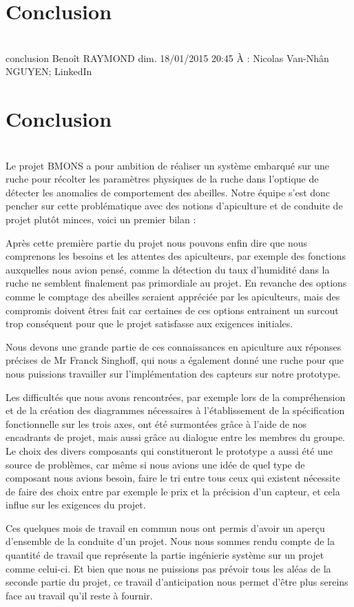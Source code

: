 \chapter{Conclusion}\\

conclusion
Benoît RAYMOND
dim. 18/01/2015 20:45
À :
Nicolas Van-Nhân NGUYEN;
LinkedIn

\chapter{Conclusion}\\


Le projet BMONS a pour ambition de réaliser un système embarqué sur une ruche pour récolter les paramètres physiques de la ruche dans l’optique de détecter les anomalies de comportement des abeilles. Notre équipe s’est donc pencher sur cette problématique avec des notions d’apiculture et de conduite de projet plutôt minces, voici un premier bilan :

Après cette première partie du projet nous pouvons enfin dire que nous comprenons les besoins et les attentes des apiculteurs, par exemple des fonctions auxquelles nous avion pensé, comme la détection du taux d'humidité dans la ruche ne semblent finalement pas primordiale au projet. En revanche des options comme le comptage des abeilles seraient appréciée par les apiculteurs, mais des compromis doivent êtres fait car certaines de ces options entrainent un surcout trop conséquent pour que le projet satisfasse aux exigences initiales.\newline 

Nous devons une grande partie de ces connaissances en apiculture aux réponses précises de Mr Franck Singhoff, qui nous a également donné une ruche pour que nous puissions travailler sur l'implémentation des capteurs sur notre prototype. \newline 

Les difficultés que nous avons rencontrées, par exemple lors de la compréhension et de la création des diagrammes nécessaires à l’établissement de la spécification fonctionnelle sur les trois axes, ont été surmontées grâce à l’aide de nos encadrants de projet, mais aussi grâce au dialogue entre les membres du groupe. Le choix des divers composants qui constitueront le prototype a aussi été une source de problèmes, car même si nous avions une idée de quel type de composant nous avions besoin, faire le tri entre tous ceux qui existent nécessite de faire des choix entre par exemple le prix et la précision d’un capteur, et cela influe sur les exigences du projet. \newline

Ces quelques mois de travail en commun nous ont permis d'avoir un aperçu d'ensemble de la conduite d'un projet. Nous nous sommes rendu compte de la quantité de travail que représente la partie ingénierie système sur un projet comme celui-ci. Et bien que nous ne puissions pas prévoir tous les aléas de la seconde partie du projet, ce travail d'anticipation nous permet d'être plus sereins face au travail qu'il reste à fournir.\newline​


